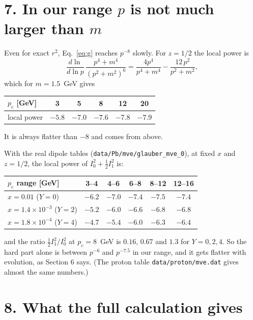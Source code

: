 \documentclass[12pt]{article}
\begin{document}
\section*{7. In our range $p$ is not much larger than $m$}

Even for exact $r^2$, Eq.~\eqref{eq:g} reaches $p^{-8}$ slowly. For $z=1/2$ the local power is
\begin{equation}
  \frac{d\ln}{d\ln p}\,\frac{p^4+m^4}{(p^2+m^2)^6} = \frac{4p^4}{p^4+m^4}-\frac{12\,p^2}{p^2+m^2},
\end{equation}
which for $m=1.5$~GeV gives
\begin{center}
\begin{tabular}{lccccc}
\toprule
$p_c$ [GeV] & 3 & 5 & 8 & 12 & 20 \\
\midrule
local power & $-5.8$ & $-7.0$ & $-7.6$ & $-7.8$ & $-7.9$ \\
\bottomrule
\end{tabular}
\end{center}
It is always flatter than $-8$ and comes from above.

With the real dipole tables (\texttt{data/Pb/mve/glauber\_mve\_0}), at fixed $x$ and $z=1/2$, the local
power of $I_0^2+\tfrac12I_1^2$ is:
\begin{center}
\begin{tabular}{lccccc}
\toprule
$p_c$ range [GeV] & 3--4 & 4--6 & 6--8 & 8--12 & 12--16 \\
\midrule
$x=0.01$ ($Y=0$)              & $-6.2$ & $-7.0$ & $-7.4$ & $-7.5$ & $-7.4$ \\
$x=1.4\times10^{-3}$ ($Y=2$)  & $-5.2$ & $-6.0$ & $-6.6$ & $-6.8$ & $-6.8$ \\
$x=1.8\times10^{-4}$ ($Y=4$)  & $-4.7$ & $-5.4$ & $-6.0$ & $-6.3$ & $-6.4$ \\
\bottomrule
\end{tabular}
\end{center}
and the ratio $\tfrac12I_1^2/I_0^2$ at $p_c=8$~GeV is $0.16$, $0.67$ and $1.3$ for $Y=0,2,4$.
So the hard part alone is between $p^{-6}$ and $p^{-7.5}$ in our range, and it gets flatter with
evolution, as Section 6 says. (The proton table \texttt{data/proton/mve.dat} gives almost the same numbers.)

\section*{8. What the full calculation gives}
\end{document}
